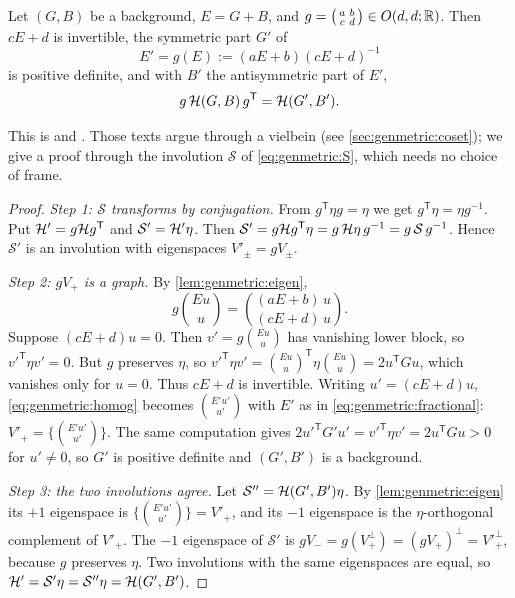 \begin{theorem}[Action on $E$ \TL]\label{thm:genmetric:fractional}
Let $(G,B)$ be a background, $E=G+B$, and
$g=\left(\begin{smallmatrix}a&b\\c&d\end{smallmatrix}\right)\in O(d,d;\mathbb{R})$. Then $cE+d$ is
invertible, the symmetric part $G'$ of
\begin{equation}\label{eq:genmetric:fractional}
 E'=g(E):=(aE+b)(cE+d)^{-1}
\end{equation}
is positive definite, and with $B'$ the antisymmetric part of $E'$,
\begin{equation}\label{eq:genmetric:gHg}
 g\,\mathcal{H}(G,B)\,g^{\mathsf T}=\mathcal{H}(G',B').
\end{equation}
\end{theorem}
\noindent This is  and
. Those
texts argue through a vielbein (see \cref{sec:genmetric:coset}); we give a proof through
the involution $\mathcal S$ of \eqref{eq:genmetric:S}, which needs no choice of frame.
\begin{proof}
\emph{Step 1: $\mathcal S$ transforms by conjugation.} From $g^{\mathsf T}\eta g=\eta$ we
get $g^{\mathsf T}\eta=\eta g^{-1}$. Put $\mathcal{H}'=g\mathcal{H} g^{\mathsf T}$ and
$\mathcal S'=\mathcal{H}'\eta$. Then
$\mathcal S'=g\mathcal{H} g^{\mathsf T}\eta=g\,\mathcal{H}\eta\,g^{-1}=g\,\mathcal S\,g^{-1}$. Hence
$\mathcal S'$ is an involution with eigenspaces $V'_\pm=gV_\pm$.

\emph{Step 2: $gV_+$ is a graph.} By \cref{lem:genmetric:eigen},
\begin{equation}\label{eq:genmetric:homog}
 g\binom{Eu}{u}=\binom{(aE+b)\,u}{(cE+d)\,u}.
\end{equation}
Suppose $(cE+d)u=0$. Then $v'=g\binom{Eu}{u}$ has vanishing lower block, so
$v'^{\mathsf T}\eta v'=0$. But $g$ preserves $\eta$, so
$v'^{\mathsf T}\eta v'=\binom{Eu}{u}^{\mathsf T}\eta\binom{Eu}{u}=2u^{\mathsf T}Gu$, which
vanishes only for $u=0$. Thus $cE+d$ is invertible. Writing $u'=(cE+d)u$,
\eqref{eq:genmetric:homog} becomes $\binom{E'u'}{u'}$ with $E'$ as in
\eqref{eq:genmetric:fractional}: $V'_+=\{\binom{E'u'}{u'}\}$. The same computation gives
$2u'^{\mathsf T}G'u'=v'^{\mathsf T}\eta v'=2u^{\mathsf T}Gu>0$ for $u'\ne0$, so $G'$ is positive
definite and $(G',B')$ is a background.

\emph{Step 3: the two involutions agree.} Let $\mathcal S''=\mathcal{H}(G',B')\eta$. By
\cref{lem:genmetric:eigen} its $+1$ eigenspace is $\{\binom{E'u'}{u'}\}=V'_+$, and its
$-1$ eigenspace is the $\eta$-orthogonal complement of $V'_+$. The $-1$ eigenspace of
$\mathcal S'$ is $gV_-=g(V_+^{\perp})=(gV_+)^\perp=V'^{\perp}_+$, because $g$ preserves
$\eta$. Two involutions with the same eigenspaces are equal, so
$\mathcal{H}'=\mathcal S'\eta=\mathcal S''\eta=\mathcal{H}(G',B')$.
\end{proof}
